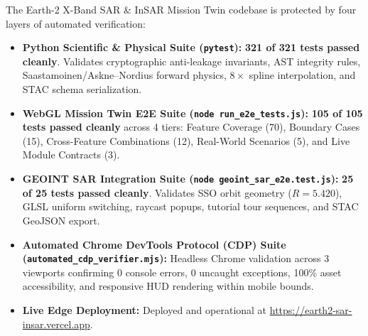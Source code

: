 \documentclass[10pt,twocolumn,letterpaper]{article}
\begin{document}
The Earth-2 X-Band SAR \& InSAR Mission Twin codebase is protected by four layers of automated verification:
\begin{itemize}[leftmargin=*,noitemsep,topsep=2pt]
    \item \textbf{Python Scientific \& Physical Suite (\texttt{pytest}):} \textbf{321 of 321 tests passed cleanly}. Validates cryptographic anti-leakage invariants, AST integrity rules, Saastamoinen/Askne--Nordius forward physics, $8\times$ spline interpolation, and STAC schema serialization.
    \item \textbf{WebGL Mission Twin E2E Suite (\texttt{node run\_e2e\_tests.js}):} \textbf{105 of 105 tests passed cleanly} across 4 tiers: Feature Coverage (70), Boundary Cases (15), Cross-Feature Combinations (12), Real-World Scenarios (5), and Live Module Contracts (3).
    \item \textbf{GEOINT SAR Integration Suite (\texttt{node geoint\_sar\_e2e.test.js}):} \textbf{25 of 25 tests passed cleanly}. Validates SSO orbit geometry ($R = 5.420$), GLSL uniform switching, raycast popups, tutorial tour sequences, and STAC GeoJSON export.
    \item \textbf{Automated Chrome DevTools Protocol (CDP) Suite (\texttt{automated\_cdp\_verifier.mjs}):} Headless Chrome validation across 3 viewports confirming 0 console errors, 0 uncaught exceptions, 100\% asset accessibility, and responsive HUD rendering within mobile bounds.
    \item \textbf{Live Edge Deployment:} Deployed and operational at \url{https://earth2-sar-insar.vercel.app}.
\end{itemize}
\end{document}
